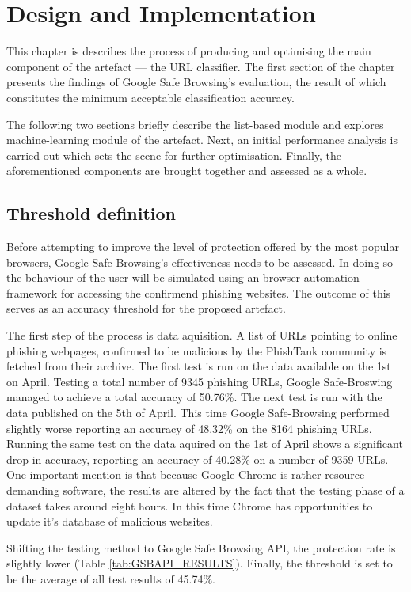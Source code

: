 
\chapter{Design and Implementation}
This chapter is describes the process of producing and optimising the main component of the artefact --- the URL classifier. The first section of the chapter presents the findings of Google Safe Browsing's evaluation, the result of which constitutes the minimum acceptable classification accuracy.

The following two sections briefly describe the list-based module and explores machine-learning module of the artefact. Next, an initial performance analysis is carried out which sets the scene for further optimisation. Finally, the aforementioned components are brought together and assessed as a whole.

\section{Threshold definition}
Before attempting to improve the level of protection offered by the most popular browsers, Google Safe Browsing's effectiveness needs to be assessed. In doing so the behaviour of the user will be simulated using an browser automation framework for accessing the confirmend phishing websites. The outcome of this serves as an accuracy threshold for the proposed artefact.

The first step of the process is data aquisition. A list of URLs pointing to online phishing webpages, confirmed to be malicious by the PhishTank community is fetched from their archive. The first test is run on the data available on the 1st on April. Testing a total number of 9345 phishing URLs, Google Safe-Broswing managed to achieve a total accuracy of 50.76\%.
The next test is run with the data published on the 5th of April. This time Google Safe-Browsing performed slightly worse reporting an accuracy of 48.32\% on the 8164 phishing URLs. Running the same test on the data aquired on the 1st of April shows a significant drop in accuracy, reporting an accuracy of 40.28\% on a number of 9359 URLs.
One important mention is that because Google Chrome is rather resource demanding software, the results are altered by the fact that the testing phase of a dataset takes around eight hours. In this time Chrome has opportunities to update it's database of malicious websites.

Shifting the testing method to Google Safe Browsing API, the protection rate is slightly lower (Table \ref{tab:GSBAPI_RESULTS}). Finally, the threshold is set to be the average of all test results of 45.74\%.



